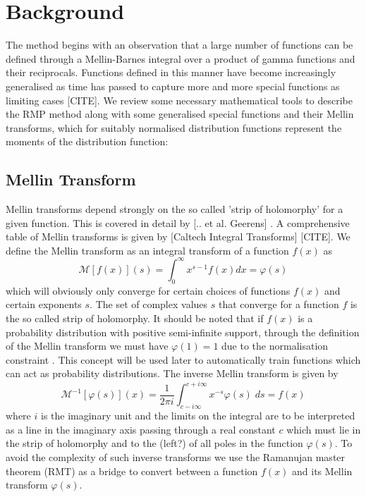 \documentclass[journal=jcisd8,manuscript=article,layout=onecolumn,pdftex,floatfix,amsmath,amssymb,10pt]{achemso}
\begin{document}
\section{Background}
The method begins with an observation that a large number of functions can be defined through a Mellin-Barnes integral over a product of gamma functions and their reciprocals. Functions defined in this manner have become increasingly generalised as time has passed to capture more and more special functions as limiting cases [CITE]. We review some necessary mathematical tools to describe the RMP method along with some generalised special functions and their Mellin transforms, which for suitably normalised distribution functions represent the moments of the distribution function:

\subsection{Mellin Transform}
Mellin transforms depend strongly on the so called 'strip of holomorphy' for a given function. This is covered in detail by [{\color{red}.. et al.} Geerens] \citep{Geerens2017}. A comprehensive table of Mellin transforms is given by [Caltech Integral Transforms] [CITE]. We define the Mellin transform as an integral transform of a function $f(x)$ as
\begin{equation}
\mathcal{M}[f(x)](s) = \int_0^\infty x^{s-1}f(x) dx = \varphi(s)
\end{equation}
which will obviously only converge for certain choices of functions $f(x)$ and certain exponents $s$. The set of complex values $s$ that converge for a function $f$ is the so called strip of holomorphy. It should be noted that if $f(x)$ is a probability distribution with positive semi-infinite support, through the definition of the Mellin transform we must have $\varphi(1)=1$ due to the normalisation constraint \citep{Geerens2017}. This concept will be used later to automatically train functions which can act as probability distributions. The inverse Mellin transform is given by
\begin{equation}
\mathcal{M}^{-1}[\varphi(s)](x) = \frac{1}{2 \pi i}\int_{c- i \infty}^{c + i \infty} x^{-s} \varphi(s) \; ds = f(x)
\label{eqn:InverseMT}
\end{equation}
where $i$ is the imaginary unit and the limits on the integral are to be interpreted as a line in the imaginary axis passing through a real constant $c$ which must lie in the strip of holomorphy and to the {\color{red}(left?)} of all poles in the function $\varphi(s)$. To avoid the complexity of such inverse transforms we use the Ramanujan master theorem (RMT) as a bridge to convert between a function $f(x)$ and its Mellin transform $\varphi(s)$.
\end{document}
